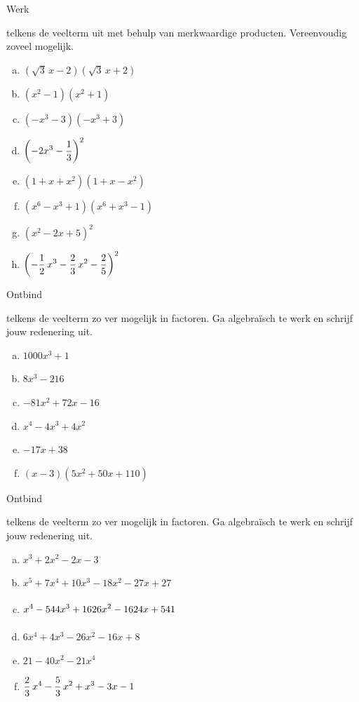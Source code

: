 \documentclass{ximera}
\begin{document}
\begin{exercise} 
\hypertarget{oef4.2}{Werk} telkens de veelterm uit met behulp van merkwaardige producten. Vereenvoudig zoveel mogelijk. 
\begin{multicols}{2}
\begin{enumerate}[(a)]
\item
$(\sqrt{3}\,x-2)(\sqrt{3}\,x+2)$
\item
$(x^2-1)(x^2+1)$
\item
$(-x^3-3)(-x^3+3)$
\item
$\displaystyle \left(-2x^3-\frac{1}{3}\right)^2$
\item
$(1+x+x^2)(1+x-x^2)$
\item
$(x^6-x^3+1)(x^6+x^3-1)$
\item
$(x^2-2x+5)^2$
\item
$\displaystyle \left(-\frac{1}{2}\,x^3 - \frac{2}{3}\,x^2-\frac{2}{5}\right)^2$
\end{enumerate}
\end{multicols}
\end{exercise} 

\begin{exercise} 
\hypertarget{oef4.3}{Ontbind} telkens de veelterm zo ver mogelijk in factoren. Ga algebra\"isch te werk en schrijf jouw redenering uit.  
\begin{multicols}{2}
\begin{enumerate}[(a)]
\item
$1000 x^3 + 1$
\item
$8x^3-216$
\item
$-81x^2+72x-16$
\item
$x^4-4x^3+4x^2$
\item
$-17x+38$
\item
$(x-3)(5x^2+50x+110)$
\end{enumerate}
\end{multicols}
\end{exercise} 

\begin{exercise} 
\hypertarget{oef4.4}{Ontbind} telkens de veelterm zo ver mogelijk in factoren. Ga algebra\"isch te werk en schrijf jouw redenering uit.  
\begin{multicols}{2}
\begin{enumerate}[(a)]
\item
$x^3+2x^2-2x-3$
\item
$x^5+7x^4+10x^3-18x^2-27x+27$
\item 
$\D x^4-544x^3+1626x^2-1624x+541 \mph{\frac{2}{3}}$
\item
$6x^4 + 4x^3 - 26x^2 - 16x + 8$
\item
$21-40x^2-21x^4$
\item
$\displaystyle \frac{2}{3}\,x^4-\frac{5}{3}\,x^2 + x^3 - 3x-1$
\end{enumerate}
\end{multicols}
\end{exercise} 
\end{document}

